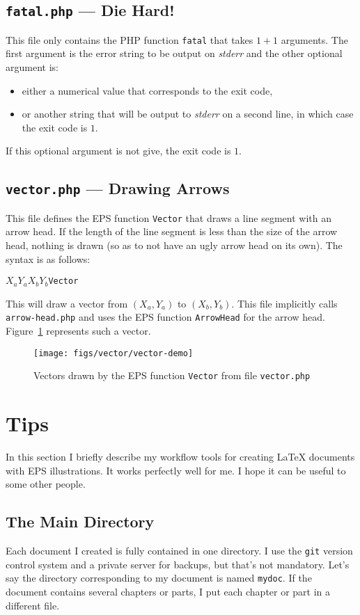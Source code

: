 \documentclass[a4paper]{scrartcl}
\begin{document}
\subsection{\texttt{fatal.php} --- Die Hard!}
This file only contains the PHP function \texttt{fatal} that takes $1+1$ arguments.
The first argument is the error string to be output on \textit{stderr} and the other
optional argument is:
\begin{itemize}
\item either a numerical value that corresponds to the exit code,
\item or another string that will be output to \textit{stderr} on a second line,
in which case the exit code is $1$.
\end{itemize}
If this optional argument is not give, the exit code is $1$.

\subsection{\texttt{vector.php} --- Drawing Arrows}
This file defines the EPS function \texttt{Vector} that draws a line segment
with an arrow head. If the length of the line segment is less than the size
of the arrow head, nothing is drawn (so as to not have an ugly arrow head on its own).
The syntax is as follows:
\begin{center}
$X_a$\quad$Y_a$\quad$X_b$\quad$Y_b$\quad\texttt{Vector}
\end{center}
This will draw a vector from $(X_a,Y_a)$ to $(X_b,Y_b)$. This file implicitly calls
\texttt{arrow-head.php} and uses the EPS function \texttt{ArrowHead} for the arrow head.
Figure~\ref{fig:vector-demo} represents such a vector.
\begin{figure}[ht!]%
\centering
\texttt{[image: figs/vector/vector-demo]}%
\caption{Vectors drawn by the EPS function \texttt{Vector} from file \texttt{vector.php}}%
\label{fig:vector-demo}%
\end{figure}

\section{Tips}
In this section I briefly describe my workflow tools for creating \LaTeX{}
documents with EPS illustrations. It works perfectly well for me. I hope it can
be useful to some other people.
\subsection{The Main Directory}
Each document I created is fully contained in one directory. I use the
\texttt{git} version control system and a private server for backups, but
that's not mandatory. Let's say the directory corresponding to my document
is named \texttt{mydoc}. If the document contains several chapters or parts,
I put each chapter or part in a different file.
\end{document}
